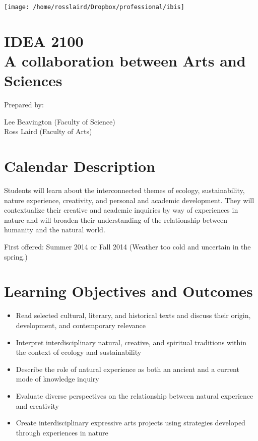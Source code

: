 \documentclass[12pt, letterpaper]{article}
\begin{document}
    \thispagestyle{empty}
    \reversemarginpar
    \noindent
    \texttt{[image: /home/rosslaird/Dropbox/professional/ibis]}\\[2em]




\section{IDEA 2100 \\A collaboration between Arts and Sciences}

Prepared by:

Lee Beavington (Faculty of Science)\\
Ross Laird (Faculty of Arts)

\section{Calendar Description}

Students will learn about the interconnected themes of ecology,
sustainability, nature experience, creativity, and personal and academic
development. They will contextualize their creative and academic
inquiries by way of experiences in nature and will broaden their
understanding of the relationship between humanity and the natural
world.

First offered: Summer 2014 or Fall 2014 (Weather too cold and uncertain
in the spring.)

\section{Learning Objectives and Outcomes}

\begin{itemize}
\item
  Read selected cultural, literary, and historical texts and discuss
  their origin, development, and contemporary relevance
\item
  Interpret interdisciplinary natural, creative, and spiritual
  traditions within the context of ecology and sustainability
\item
  Describe the role of natural experience as both an ancient and a
  current mode of knowledge inquiry
\item
  Evaluate diverse perspectives on the relationship between natural
  experience and creativity
\item
  Create interdisciplinary expressive arts projects using strategies
  developed through experiences in nature
\end{itemize}
\end{document}
